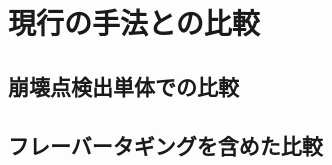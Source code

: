 
\chapter{現行の手法との比較} \label{chap:Comparison}


\section{崩壊点検出単体での比較} \label{Com:ComparisonwithVF}


\section{フレーバータギングを含めた比較} \label{Com:FlavorTaggingComparison}



























